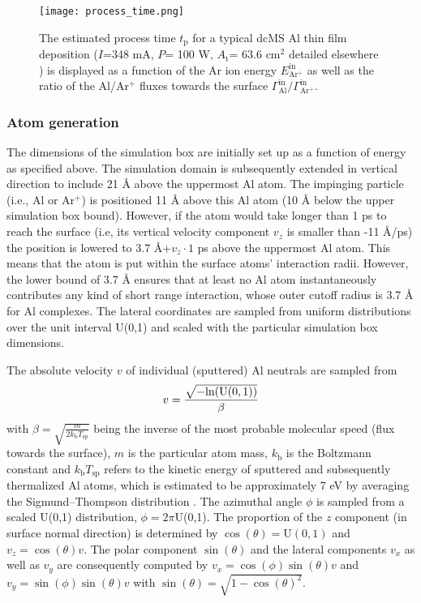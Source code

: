 \documentclass[12pt,a4paper,preprint,superscriptaddress]{revtex4-1}
\begin{document}
\begin{figure}[t]
\texttt{[image: process\_time.png]}
\caption{The estimated process time $t_\mathrm{p}$ for a typical dcMS Al thin film deposition ($I$=348 mA, $P$= 100 W, $A_\mathrm{t}$= 63.6 cm$^2$ detailed elsewhere \citep{trieschmann2018combined}) is displayed as a function of the Ar ion energy $E_\mathrm{Ar^+}^\mathrm{in}$ as well as the ratio of the Al/Ar$^+$ fluxes towards the surface $\Gamma_\mathrm{Al}^\mathrm{in}/\Gamma_\mathrm{Ar^+}^\mathrm{in}$.}
\label{fig:process_time}
\end{figure}

\subsubsection{Atom generation}
\label{sssec:atom_generation}

The dimensions of the simulation box are initially set up as a function of energy as specified above. The simulation domain is subsequently extended in vertical direction to include 21 \r A above the uppermost Al atom. The impinging particle (i.e., Al or Ar$^+$) is positioned 11 \r A above this Al atom (10 \r A below the upper simulation box bound). However, if the atom would take longer than 1 ps to reach the surface (i.e, its vertical velocity component $v_z$ is smaller than -11 \r A/ps) the position is lowered to 3.7 \r A+$v_z \cdot 1$ ps above the uppermost Al atom. This means that the atom is put within the surface atoms' interaction radii. However, the lower bound of 3.7 \r A ensures that at least no Al atom instantaneously contributes any kind of short range interaction, whose outer cutoff radius is 3.7 \r A for Al complexes. The lateral coordinates are sampled from uniform distributions over the unit interval U(0,1) and scaled with the particular simulation box dimensions. 

The absolute velocity $v$ of individual (sputtered) Al neutrals are sampled from  
\begin{equation}
\label{eq:velocity_sampling}\\
v = \frac{\sqrt{-\mathrm{ln}(\mathrm{U(0,1)})}}{\beta}
\end{equation}
with $\beta = \sqrt{\frac{m}{2k_\mathrm{b}T_\mathrm{sp}}}$ being the inverse of the most probable molecular speed (flux towards the surface), $m$ is the particular atom mass, $k_\mathrm{b}$ is the Boltzmann constant and $k_\mathrm{b}T_\mathrm{sp}$ refers to the kinetic energy of sputtered and subsequently thermalized Al atoms, which is estimated to be approximately 7 eV by averaging the Sigmund--Thompson distribution \citep{bird1994molecular,thompson1968ii,sigmund1969theory,sigmund1969theory2}. The azimuthal angle $\phi$ is sampled from a scaled U(0,1) distribution, $\phi = 2\pi$U(0,1). The proportion of the $z$ component (in surface normal direction) is determined by $\cos(\theta)=\mathrm{U}(0,1)$ and $v_z=\cos(\theta) v$. The polar component $\sin(\theta)$ and the lateral components $v_x$ as well as $v_y$ are consequently computed by $v_x=\cos(\phi)\sin(\theta)v$ and $v_y=\sin(\phi)\sin(\theta)v$ with $\sin(\theta)=\sqrt{1-\cos(\theta)^2}$.
\end{document}
